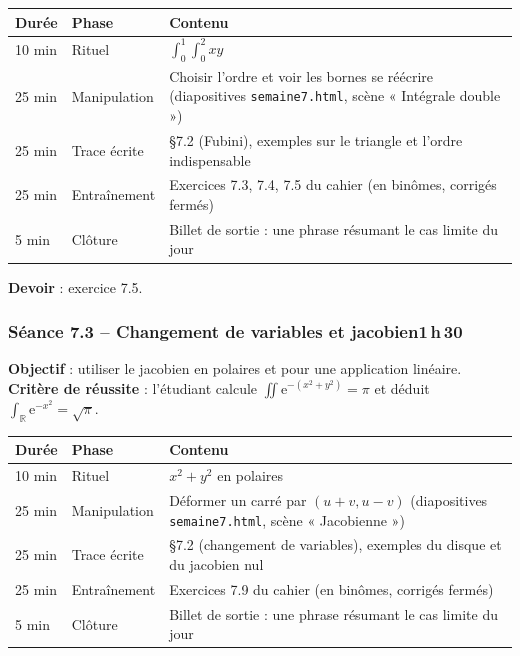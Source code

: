 \documentclass[10.5pt,a4paper]{article}
\newif\ifprof
\newcommand{\R}{\mathbb{R}}\newcommand{\C}{\mathbb{C}}\newcommand{\e}{\mathrm{e}}
\newcommand{\profonly}[1]{\ifprof #1\fi}
\begin{document}
\begin{longtable}{@{}p{1.1cm}p{2.4cm}p{12.4cm}@{}}
\toprule \textbf{Durée} & \textbf{Phase} & \textbf{Contenu}\\ \midrule\endhead
10 min & Rituel & $\int_0^1\int_0^2xy$\\
25 min & Manipulation & Choisir l'ordre et voir les bornes se réécrire (diapositives \texttt{semaine7.html}, scène « Intégrale double »)\\
25 min & Trace écrite & \S7.2 (Fubini), exemples sur le triangle et l'ordre indispensable\\
25 min & Entraînement & Exercices 7.3, 7.4, 7.5 du cahier (en binômes, corrigés fermés)\\
5 min & Clôture & Billet de sortie : une phrase résumant le cas limite du jour\\ \bottomrule\end{longtable}\nopagebreak
\textbf{Devoir} : exercice 7.5.\profonly{ \textbf{Point de vigilance} : Tracer le domaine avant tout calcul.}\par
{}\subsubsection*{\textcolor{marine}{Séance 7.3 -- Changement de variables et jacobien}\hfill\normalfont\small\textcolor{ardoise}{1\,h\,30}}
\begin{objectif}\textbf{Objectif} : utiliser le jacobien en polaires et pour une application linéaire.\\\textbf{Critère de réussite} : l'étudiant calcule $\iint\e^{-(x^2+y^2)}=\pi$ et déduit $\int_{\R}\e^{-x^2}=\sqrt\pi$.\end{objectif}\nopagebreak
\begin{longtable}{@{}p{1.1cm}p{2.4cm}p{12.4cm}@{}}
\toprule \textbf{Durée} & \textbf{Phase} & \textbf{Contenu}\\ \midrule\endhead
10 min & Rituel & $x^2+y^2$ en polaires\\
25 min & Manipulation & Déformer un carré par $(u+v,u-v)$ (diapositives \texttt{semaine7.html}, scène « Jacobienne »)\\
25 min & Trace écrite & \S7.2 (changement de variables), exemples du disque et du jacobien nul\\
25 min & Entraînement & Exercices 7.9 du cahier (en binômes, corrigés fermés)\\
5 min & Clôture & Billet de sortie : une phrase résumant le cas limite du jour\\ \bottomrule\end{longtable}\nopagebreak
\end{document}
